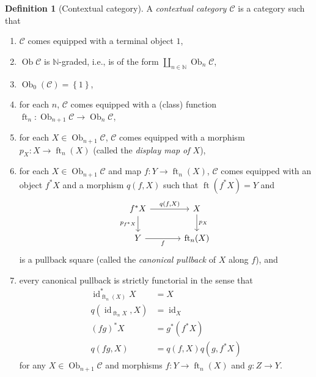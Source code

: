 \documentclass[10pt,letterpaper,cm]{nupset}
\theoremstyle{definition}
\newtheorem{definition}{Definition}[subsection]
\theoremstyle{theorem}
\theoremstyle{remark}
\DeclareMathOperator{\ft}{ft}
\DeclareMathOperator{\ob}{Ob}
\newcommand{\0}{\mathbf{0}}
\newcommand{\1}{\mathbf{1}}
\newcommand{\2}{\mathbf{2}}
\renewcommand{\c}{\mathscr{C}}
\newcommand{\N}{\mathbb N}
\DeclareMathOperator{\idd}{id}
\newcommand{\be}{\begin{enumerate}}
\newcommand{\ee}{\end{enumerate}}
\begin{document}
\begin{definition}[Contextual category]\label{ccat} A \textit{contextual category $\c$} is a category  such that
\be[label=(\roman*)]
\item $\c$ comes equipped with a terminal object $1$,
\item $\ob{\c}$ is $\N$-graded, i.e., is of the form $\coprod_{n\in \N}\ob_n{\c}$,
\item $\ob_0(\c) = \left\{1\right\}$,
\item for each $n$, $\c$ comes equipped with a (class) function $\ft_n: \ob_{n+1}{\c} \to \ob_n{\c}$,
\item for each $X\in \ob_{n+1}{\c}$, $\c$ comes equipped with a morphism $p_X : X \to \ft_n(X)$ (called the \textit{display map of $X$}),
\item for each $X\in \ob_{n+1}{\c}$ and map $f: Y \to \ft_n(X)$, $\c$ comes equipped with an object $f^{\ast}{X}$ and a morphism $q(f,X)$ such that $\ft\left(f^{*} X\right)=Y$ and 
\[
\begin{tikzcd}[column sep=large]
f^{\ast}{X} \arrow[d, "p_{f^{\ast}{X}}"'] \arrow[r, "{q(f,X)}"] & X \arrow[d, "p_X"] \\
Y \arrow[r, "f"']                                               & \ft_n(X)          
\end{tikzcd}
\] is a pullback square (called the \textit{canonical pullback} of $X$ along $f$), and
\item every canonical pullback is strictly functorial in the sense that
\begin{align*}
\idd_{\ft_n(X)}^{\ast}{X}& = X
\\ q\left(\idd_{\ft_n{X}}, X\right) & = \idd_X
\\ \left(fg\right)^{\ast}{X} & = g^{\ast}\left(f^{\ast}{X}\right) 
\\ q\left(fg, X\right) & = q\left(f, X\right)q\left(g, f^{\ast}{X}\right)
\end{align*}
for any $X\in \ob_{n+1}{\c}$ and morphisms $f: Y \to \ft_n(X)$ and $g:Z \to Y$.
\ee
\end{definition}
\end{document}

